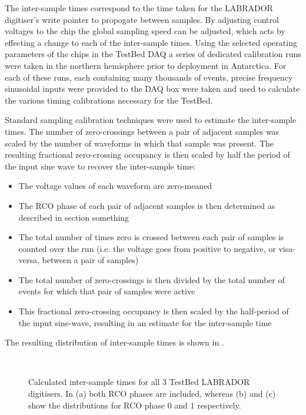 The inter-sample times correspond to the time taken for the LABRADOR digitiser's write pointer to propogate between samples. By adjusting control voltages to the chip the global sampling speed can be adjusted, which acts by effecting a change to each of the inter-sample times. Using the selected operating parameters of the chips in the TestBed DAQ a series of dedicated calibration runs were taken in the northern hemisphere prior to deployment in Antarctica. For each of these runs, each containing many thousands of events,  precise frequency sinusoidal inputs were provided to the DAQ box were taken and used to calculate the various timing calibrations necessary for the TestBed. 

Standard sampling calibration techniques were used to estimate the inter-sample times. The number of zero-crossings between a pair of adjacent samples was scaled by the number of waveforms in which that sample was present. The resulting fractional zero-crossing occupancy is then scaled by half the period of the input sine wave to recover the inter-sample time:

\begin{itemize}
\item The voltage values of each waveform are zero-meaned 
\item The RCO phase of each pair of adjacent samples is then determined as described in section something %
\item The total number of times zero is crossed between each pair of samples is counted over the run (i.e. the voltage goes from positive to negative, or visa-versa, between a pair of samples)
\item The total number of zero-crossings is then divided by the total number of events for which that pair of samples were active
\item This fractional zero-crossing occupancy is then scaled by the half-period of the input sine-wave, resulting in an estimate for the inter-sample time
\end{itemize}


The resulting distribution of inter-sample times is shown in .



\begin{figure}[htpb]
  \\
  \hfill
  \caption{Calculated inter-sample times for all 3 TestBed LABRADOR digitisers. In (a) both RCO phases are included, whereas (b) and (c) show the distributions for RCO phase 0 and 1 respectively.}
  \label{fig:calibration:LABRADOR-Digitiser-Chip:Inter-sample-times}
\end{figure}

